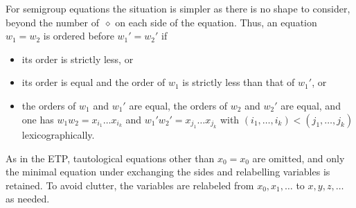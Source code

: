 \documentclass[12pt]{amsart}
\theoremstyle{plain}
\theoremstyle{definition}
\newcommand{\op}{\diamond}
\begin{document}
For semigroup equations the situation is simpler as there is no shape to consider, beyond the number of~$\op$ on each side of the equation.  Thus, an equation $w_1=w_2$ is ordered before $w_1'=w_2'$ if
\begin{itemize}
\item its order is strictly less, or
\item its order is equal and the order of $w_1$ is strictly less than that of $w_1'$, or
\item the orders of $w_1$ and $w_1'$ are equal, the orders of $w_2$ and $w_2'$ are equal, and one has $w_1w_2=x_{i_1}\dots x_{i_k}$ and $w_1'w_2'=x_{j_1}\dots x_{j_k}$ with $(i_1,\dots,i_k)<(j_1,\dots,j_k)$ lexicographically.
\end{itemize}
As in the ETP, tautological equations other than $x_0=x_0$ are omitted, and only the minimal equation under exchanging the sides and relabelling variables is retained.
To avoid clutter, the variables are relabeled from $x_0,x_1,\dots$ to $x,y,z,\dots$ as needed.
\end{document}
